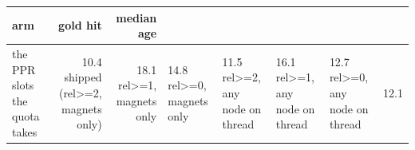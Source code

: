 \begin{tabular}{lrr}
\toprule
arm & gold hit & median age \\
\midrule
the PPR slots the quota takes & 10.4%
shipped (rel>=2, magnets only) & 18.1%
rel>=1, magnets only & 14.8%
rel>=0, magnets only & 11.5%
rel>=2, any node on thread & 16.1%
rel>=1, any node on thread & 12.7%
rel>=0, any node on thread & 12.1%
\bottomrule
\end{tabular}

